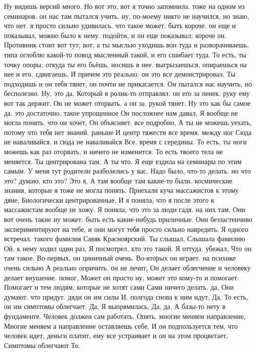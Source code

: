 Ну видишь версий много.
Но вот это, вот я точно запомнила.
тоже на одном из семинаров. он нас там пытался учить. ну, по-моему никто не научился, но знаю, что нет. я просто сильно удивилась.
что такое может.
быть короче. он еще и показывал, можно было к нему.
подойти, и он еще показывал: короче он.
Противник стоит вот тут, вот, а ты мыслью уходишь вон туда и разворачиваешь, типа оглоблю какой-то повод мысленный такой, и его сшибает туда. То есть, ты точку опоры, откуда ты его бьёшь, носишь в нее.
выгрызаешься, опираешься на нее и его.
сдвигаешь, И причем это реально. он это все демонстрировал. Ты подходишь и он тебя тянет, он почти не прикасается.
Он пытался нас научить, но бесполезно. Ну, это да, Который я ролик-то отправлял. он его за пенек. руку ему вот так держит. Он не может оторвать, а он за.
рукой тянет. Ну это как бы самое да. это достаточно. такое упрощенное Он посложнее нам давал, Я вообще не могла понять.
что он хочет, Он объясняет.
все подробно, А ты не можешь уехать, потому что
тебя нет знаний.
раньше И центр тяжести все время.
между ног Сюда не наваливайся.
и сюда не наваливайся Все.
время с середины.
То есть, ты ноги можешь как раз оторвать, и ничего не изменится.
То есть твоего тела не меняется.
Ты центрирована там.
А ты что.
Я еще ездила на семинары по этим самым.
У меня тут родители разболелись у вас.
Надо было, что-то делать.
но что это?
думаю, кто это? Это я, А там вообще там какие-то были.
космические знания, которые я тоже не могла понять. Приехали куча массажистов к этому дяне, Биологически центрированные, И я поняла, что я после этого к массажистам вообще не хожу. Я поняла, что это за люди гадя.
на них там. Они вот очень такие ну может.
быть есть какие-нибудь приличные. Они беззастенчиво экспериментируют на тебе, и они могут тебя просто сильно навредить. Я одного встречал.
такого фамилия Савяк Красноярский. Ты слышал, Слышала фамилию Ой.
к нему ходил один раз, Я посмотрел, кто это такой. Я оттуда.
убежал, Что он там такое.
Во-первых, он циничный очень.
Во-вторых он играет.
на психике очень сильно А реально опричить. он не лечит, Он делает облегчение и
человеку делает внушение.
помог, Может он просто ну, может это кому-то и помогает. Помогает и тем людям, которые не хотят сами Сами ничего делать.
да, Они думают.
что придут. дяди он им силы И.
полгода снова к ним идут, Да, То есть, он им симптомы облегчает. Да, Я выпрямилась, Да, да.
А базы-то нету в фундаменте. Человек должен сам работать.
Опять. многие меняем направление, Многие меняем а направление оставляешь себе, И он подпользуется тем, что человек идет, деньги платит, ему все устраивает и он на этом процветает. Симптомы облегчают То.
